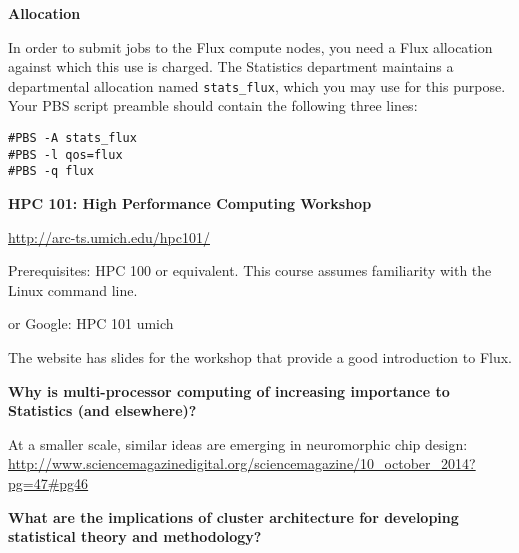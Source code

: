 \documentclass[portrait,11pt]{seminar}
\begin{document}
{\bf Allocation}

In order to submit jobs to the Flux compute nodes, you need a Flux allocation against which this use is charged.  The Statistics department maintains a departmental allocation named {\verb|stats_flux|}, which you may use for this purpose.  Your PBS script preamble should contain the following three lines:

\begin{verbatim}
#PBS -A stats_flux
#PBS -l qos=flux
#PBS -q flux
\end{verbatim}


\es
\bs

{\bf HPC 101: High Performance Computing Workshop}

\vspace{4mm}

\url{http://arc-ts.umich.edu/hpc101/}

Prerequisites: HPC 100 or equivalent. This course assumes familiarity with the Linux command line.


\vspace{4mm}

or Google: HPC 101 umich

\vspace{4mm}

The website has slides for the workshop that provide a good introduction to Flux.

\es







\bs

\bf Why is multi-processor computing of increasing importance to Statistics (and elsewhere)?


\vfill
At a smaller scale, similar ideas are emerging in neuromorphic chip design:
\url{http://www.sciencemagazinedigital.org/sciencemagazine/10_october_2014?pg=47#pg46}

\es

\bs
\bf What are the implications of cluster architecture for developing 
statistical theory and methodology?

\vfill

\es
\end{document}
